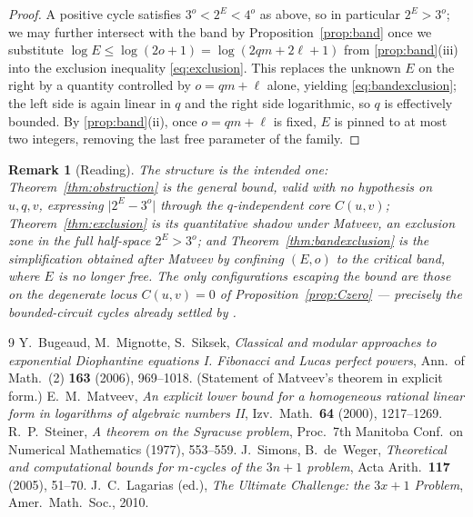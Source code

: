 \documentclass[11pt,a4paper]{article}
\theoremstyle{bourbaki}
\theoremstyle{bourbakidef}
\newtheorem{rem}[thm]{Remark}
\begin{document}
\begin{proof}
A positive cycle satisfies $3^{o}<2^{E}<4^{o}$ as above, so in particular $2^{E}>3^{o}$;
we may further intersect with the band by Proposition~\ref{prop:band} once we substitute
$\log E\le\log(2o+1)=\log(2qm+2\ell+1)$ from \ref{prop:band}(iii) into the exclusion
inequality \eqref{eq:exclusion}. This replaces the unknown $E$ on the right by a quantity
controlled by $o=qm+\ell$ alone, yielding \eqref{eq:bandexclusion}; the left side is again
linear in $q$ and the right side logarithmic, so $q$ is effectively bounded. By
\ref{prop:band}(ii), once $o=qm+\ell$ is fixed, $E$ is pinned to at most two integers,
removing the last free parameter of the family.
\end{proof}

\begin{rem}[Reading]
The structure is the intended one: Theorem~\ref{thm:obstruction} is the \emph{general}
bound, valid with no hypothesis on $u,q,v$, expressing $\lvert2^{E}-3^{o}\rvert$ through
the $q$-independent core $C(u,v)$; Theorem~\ref{thm:exclusion} is its quantitative shadow
under Matveev, an exclusion zone in the full half-space $2^{E}>3^{o}$; and
Theorem~\ref{thm:bandexclusion} is the simplification obtained \emph{after} Matveev by
confining $(E,o)$ to the critical band, where $E$ is no longer free. The only configurations
escaping the bound are those on the degenerate locus $C(u,v)=0$ of
Proposition~\ref{prop:Czero} --- precisely the bounded-circuit cycles already settled by
\cite{Steiner,SdW}.
\end{rem}

\begin{thebibliography}{9}
 Y.~Bugeaud, M.~Mignotte, S.~Siksek,
  \emph{Classical and modular approaches to exponential Diophantine equations I.
  Fibonacci and Lucas perfect powers}, Ann.\ of Math.\ (2) \textbf{163} (2006), 969--1018.
  (Statement of Matveev's theorem in explicit form.)
 E.~M.~Matveev,
  \emph{An explicit lower bound for a homogeneous rational linear form in logarithms of
  algebraic numbers II}, Izv.\ Math.\ \textbf{64} (2000), 1217--1269.
 R.~P.~Steiner,
  \emph{A theorem on the Syracuse problem}, Proc.\ 7th Manitoba Conf.\ on Numerical
  Mathematics (1977), 553--559.
 J.~Simons, B.~de~Weger,
  \emph{Theoretical and computational bounds for $m$-cycles of the $3n+1$ problem},
  Acta Arith.\ \textbf{117} (2005), 51--70.
 J.~C.~Lagarias (ed.),
  \emph{The Ultimate Challenge: the $3x+1$ Problem}, Amer.\ Math.\ Soc., 2010.
\end{thebibliography}
\end{document}
